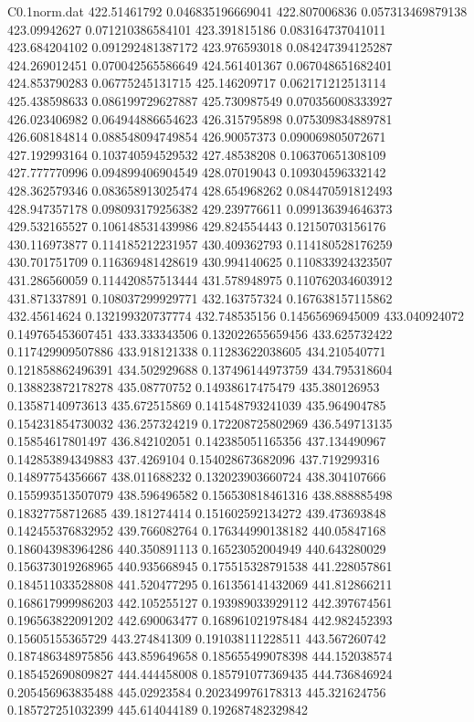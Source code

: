 \begin{filecontents}{C0.1norm.dat}
422.51461792		0.046835196669041
422.807006836		0.057313469879138
423.09942627		0.071210386584101
423.391815186		0.083164737041011
423.684204102		0.091292481387172
423.976593018		0.084247394125287
424.269012451		0.070042565586649
424.561401367		0.067048651682401
424.853790283		0.06775245131715
425.146209717		0.062171212513114
425.438598633		0.086199729627887
425.730987549		0.070356008333927
426.023406982		0.064944886654623
426.315795898		0.075309834889781
426.608184814		0.088548094749854
426.90057373		0.090069805072671
427.192993164		0.103740594529532
427.48538208		0.106370651308109
427.777770996		0.094899406904549
428.07019043		0.109304596332142
428.362579346		0.083658913025474
428.654968262		0.084470591812493
428.947357178		0.098093179256382
429.239776611		0.099136394646373
429.532165527		0.106148531439986
429.824554443		0.12150703156176
430.116973877		0.114185212231957
430.409362793		0.114180528176259
430.701751709		0.116369481428619
430.994140625		0.110833924323507
431.286560059		0.114420857513444
431.578948975		0.110762034603912
431.871337891		0.108037299929771
432.163757324		0.167638157115862
432.45614624		0.132199320737774
432.748535156		0.14565696945009
433.040924072		0.149765453607451
433.333343506		0.132022655659456
433.625732422		0.117429909507886
433.918121338		0.11283622038605
434.210540771		0.121858862496391
434.502929688		0.137496144973759
434.795318604		0.138823872178278
435.08770752		0.14938617475479
435.380126953		0.13587140973613
435.672515869		0.141548793241039
435.964904785		0.154231854730032
436.257324219		0.172208725802969
436.549713135		0.15854617801497
436.842102051		0.142385051165356
437.134490967		0.142853894349883
437.4269104		0.154028673682096
437.719299316		0.14897754356667
438.011688232		0.132023903660724
438.304107666		0.155993513507079
438.596496582		0.156530818461316
438.888885498		0.18327758712685
439.181274414		0.151602592134272
439.473693848		0.142455376832952
439.766082764		0.176344990138182
440.05847168		0.186043983964286
440.350891113		0.16523052004949
440.643280029		0.156373019268965
440.935668945		0.175515328791538
441.228057861		0.184511033528808
441.520477295		0.161356141432069
441.812866211		0.168617999986203
442.105255127		0.193989033929112
442.397674561		0.196563822091202
442.690063477		0.168961021978484
442.982452393		0.15605155365729
443.274841309		0.191038111228511
443.567260742		0.187486348975856
443.859649658		0.185655499078398
444.152038574		0.185452690809827
444.444458008		0.185791077369435
444.736846924		0.205456963835488
445.02923584		0.202349976178313
445.321624756		0.185727251032399
445.614044189		0.192687482329842

\end{filecontents}

